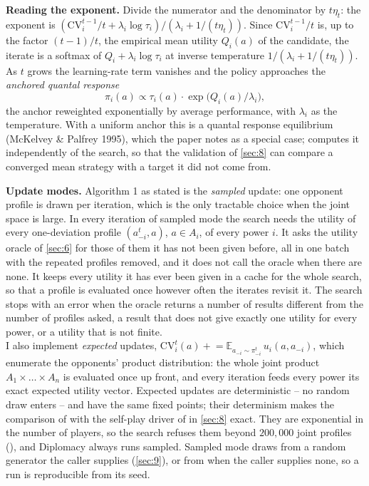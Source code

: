\documentclass[12pt,a4paper]{article}
\begin{document}
\textbf{Reading the exponent.}
Divide the numerator and the denominator by $t \eta_t$: the exponent is $(\mathrm{CV}_i^{t-1} / t + \lambda_i \log \tau_i) / (\lambda_i + 1 / (t \eta_t))$.
Since $\mathrm{CV}_i^{t-1} / t$ is, up to the factor $(t-1)/t$, the empirical mean utility $Q_i(a)$ of the candidate, the iterate is a softmax of $Q_i + \lambda_i \log \tau_i$ at inverse temperature $1 / (\lambda_i + 1 / (t \eta_t))$.
As $t$ grows the learning-rate term vanishes and the policy approaches the \emph{anchored quantal response}
\[
\pi_i(a) \propto \tau_i(a) \cdot \exp\bigl( Q_i(a) / \lambda_i \bigr),
\]
the anchor reweighted exponentially by average performance, with $\lambda_i$ as the temperature.
With a uniform anchor this is a quantal response equilibrium (McKelvey \& Palfrey 1995), which the paper notes as a special case;  computes it independently of the search, so that the validation of \cref{sec:8} can compare a converged mean strategy with a target it did not come from.

\textbf{Update modes.}
Algorithm 1 as stated is the \emph{sampled} update: one opponent profile is drawn per iteration, which is the only tractable choice when the joint space is large.
In every iteration of sampled mode the search needs the utility of every one-deviation profile $(a_{-i}^{t}, a)$, $a \in A_i$, of every power $i$.
It asks the utility oracle of \cref{sec:6} for those of them it has not been given before, all in one batch with the repeated profiles removed, and it does not call the oracle when there are none.
It keeps every utility it has ever been given in a cache for the whole search, so that a profile is evaluated once however often the iterates revisit it.
The search stops with an error when the oracle returns a number of results different from the number of profiles asked, a result that does not give exactly one utility for every power, or a utility that is not finite.\\
I also implement \emph{expected} updates, $\mathrm{CV}_i^{t}(a) \mathrel{+}= \mathbb{E}_{a_{-i} \sim \pi_{-i}^{t}}\, u_i(a, a_{-i})$, which enumerate the opponents' product distribution: the whole joint product $A_1 \times \dots \times A_n$ is evaluated once up front, and every iteration feeds every power its exact expected utility vector.
Expected updates are deterministic -- no random draw enters -- and have the same fixed points; their determinism makes the comparison of  with the self-play driver of  in \cref{sec:8} exact.
They are exponential in the number of players, so the search refuses them beyond $200{,}000$ joint profiles (), and Diplomacy always runs sampled.
Sampled mode draws from a random generator the caller supplies (\cref{sec:9}), or from  when the caller supplies none, so a run is reproducible from its seed.
\end{document}
